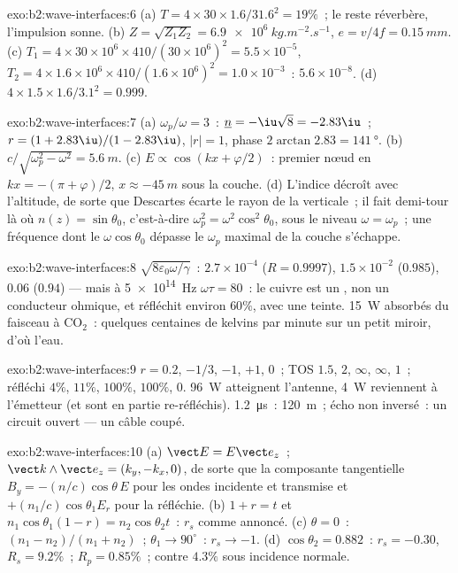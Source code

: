 \begin{solution}{exo:b2:wave-interfaces:6}
(a) $T = 4 \times 30 \times 1.6/31.6^2 = 19\%$~; le reste réverbère, l'impulsion
sonne. (b) $Z = \sqrt{Z_1Z_2} = \qty{6.9e6}{kg.m^{-2}.s^{-1}}$, $e = v/4f = \qty{0.15}{mm}$.
(c) $T_1 = 4 \times 30 \times 10^6 \times 410/(30 \times 10^6)^2 = 5.5 \times 10^{-5}$, $T_2 = 4 \times 1.6 \times
10^6 \times 410/(1.6 \times 10^6)^2 = 1.0 \times 10^{-3}$~: $5.6 \times 10^{-8}$. (d) $4 \times 1.5 \times 1.6/
3.1^2 = 0.999$.
\end{solution}

\begin{solution}{exo:b2:wave-interfaces:7}
(a) $\omega_p/\omega = 3$~: $\underline n = -\iu\sqrt8 = -2.83\iu$~; $r = (1 + 2.83\iu)/(1 - 2.83
\iu)$, $|r| = 1$, phase $2\arctan2.83 = \qty{141}{\degree}$. (b) $c/\sqrt{\omega_p^2 - \omega^2}
= \qty{5.6}{m}$. (c) $E \propto \cos(kx + \varphi/2)$~: premier nœud en $kx = -(\pi + \varphi)/2$,
$x \approx \qty{-45}{m}$ sous la couche. (d) L'indice décroît avec l'altitude, de sorte que
Descartes écarte le rayon de la verticale~; il fait demi-tour là où
$n(z) = \sin\theta_0$, c'est-à-dire $\omega_p^2 = \omega^2\cos^2\theta_0$, sous le niveau $\omega = \omega_p$~;
une fréquence dont le $\omega\cos\theta_0$ dépasse le $\omega_p$ maximal de la couche
s'échappe.
\end{solution}

\begin{solution}{exo:b2:wave-interfaces:8}
$\sqrt{8\varepsilon_0\omega/\gamma}$~: $2.7 \times 10^{-4}$ ($R = 0.9997$), $1.5 \times 10^{-2}$ ($0.985$),
$0.06$ ($0.94$) --- mais à \qty{5e14}{Hz} $\omega\tau = 80$~: le cuivre est un ,
non un conducteur ohmique, et réfléchit environ $60\%$, avec une teinte. \qty{15}{W}
absorbés du faisceau à CO$_2$~: quelques centaines de kelvins par minute sur un
petit miroir, d'où l'eau.
\end{solution}

\begin{solution}{exo:b2:wave-interfaces:9}
$r = 0.2$, $-1/3$, $-1$, $+1$, $0$~; TOS $1.5$, $2$, $\infty$, $\infty$, $1$~; réfléchi
$4\%$, $11\%$, $100\%$, $100\%$, $0$. \qty{96}{W} atteignent l'antenne, \qty{4}{W}
reviennent à l'émetteur (et sont en partie re-réfléchis). \qty{1.2}{\micro s}~:
\qty{120}{m}~; écho non inversé~: un circuit ouvert --- un câble coupé.
\end{solution}

\begin{solution}{exo:b2:wave-interfaces:10}
(a) $\vect E = E\vect e_z$~; $\vect k\wedge\vect e_z = (k_y, -k_x, 0)$, de sorte que la composante tangentielle
$B_y = -(n/c)\cos\theta\,E$ pour les ondes incidente et transmise et
$+(n_1/c)\cos\theta_1E_r$ pour la réfléchie. (b) $1 + r = t$ et $n_1\cos\theta_1
(1 - r) = n_2\cos\theta_2t$~: $r_s$ comme annoncé. (c) $\theta = 0$~: $(n_1 - n_2)/(n_1 +
n_2)$~; $\theta_1 \to 90^\circ$~: $r_s \to -1$. (d) $\cos\theta_2 = 0.882$~: $r_s = -0.30$, $R_s =
9.2\%$~; $R_p = 0.85\%$~; contre $4.3\%$ sous incidence normale.
\end{solution}

